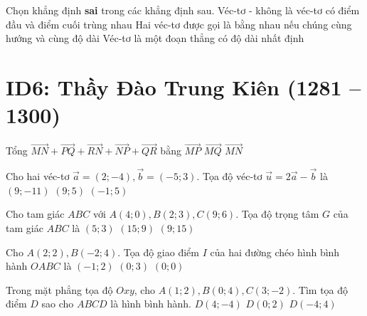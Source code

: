 \begin{ex}%
	Chọn khẳng định \textbf{sai} trong các khẳng định sau.
	{Véc-tơ - không là véc-tơ có điểm đầu và điểm cuối trùng nhau}
	{Hai véc-tơ được gọi là bằng nhau nếu chúng cùng hướng và cùng độ dài}
	{\True Véc-tơ là một đoạn thẳng có độ dài nhất định}
\end{ex}



\section*{ID6: Thầy Đào Trung Kiên (1281 -- 1300)}
\begin{ex}%
	Tổng $\vec{MN} + \vec{PQ} + \vec{RN} + \vec{NP} + \vec{QR}$ bằng
	{$\vec{MP}$}
	{$\vec{MQ}$}
	{\True $\vec{MN}$}
\end{ex}

\begin{ex}%
	Cho hai véc-tơ $\vec{a} = (2; -4), \vec{b} = (-5; 3)$. Tọa độ véc-tơ $\vec{u} = 2\vec{a} - \vec{b}$ là
	{\True $(9; -11)$}
	{$(9; 5)$}
	{$(-1; 5)$}
\end{ex}

\begin{ex}%
	Cho tam giác $ABC$ với $A(4; 0), B(2; 3), C(9; 6)$. Tọa độ trọng tâm $G$ của tam giác $ABC$ là
	{\True $(5; 3)$}
	{$(15; 9)$}
	{$(9; 15)$}
\end{ex}

\begin{ex}%
	Cho $A(2; 2), B(-2; 4)$. Tọa độ giao điểm $I$ của hai đường chéo hình bình hành $OABC$ là
	{\True $(-1; 2)$}
	{$(0; 3)$}
	{$(0; 0)$}
\end{ex}

\begin{ex}%
	Trong mặt phẳng tọa độ $Oxy$, cho $A(1; 2), B(0; 4), C(3; -2)$. Tìm tọa độ điểm $D$ sao cho $ABCD$ là hình bình hành.
	{\True $D(4; -4)$}
	{$D(0;2)$}
	{$D(-4; 4)$}
\end{ex}

